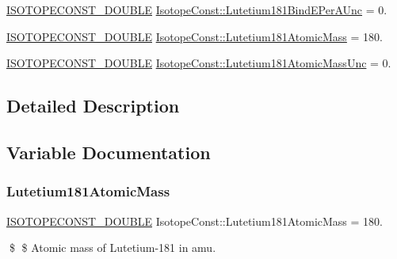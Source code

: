 \begin{DoxyCompactItemize}
\mbox{\hyperlink{group___isotope_const-_macros_ga8f45a7272ce02c0b4c65c44636ed719a}{I\+S\+O\+T\+O\+P\+E\+C\+O\+N\+S\+T\+\_\+\+D\+O\+U\+B\+LE}} \mbox{\hyperlink{group___isotope_const-_lutetium-_lu181_ga273de36f4896ca3aa2eb261a044ad5ef}{Isotope\+Const\+::\+Lutetium181\+Bind\+E\+Per\+A\+Unc}} = 0.
\item 
\mbox{\hyperlink{group___isotope_const-_macros_ga8f45a7272ce02c0b4c65c44636ed719a}{I\+S\+O\+T\+O\+P\+E\+C\+O\+N\+S\+T\+\_\+\+D\+O\+U\+B\+LE}} \mbox{\hyperlink{group___isotope_const-_lutetium-_lu181_ga4a160b5abe0c78e41e1a628c8f925eb1}{Isotope\+Const\+::\+Lutetium181\+Atomic\+Mass}} = 180.
\item 
\mbox{\hyperlink{group___isotope_const-_macros_ga8f45a7272ce02c0b4c65c44636ed719a}{I\+S\+O\+T\+O\+P\+E\+C\+O\+N\+S\+T\+\_\+\+D\+O\+U\+B\+LE}} \mbox{\hyperlink{group___isotope_const-_lutetium-_lu181_gaa7a58f877e75c5169ab76a0796108783}{Isotope\+Const\+::\+Lutetium181\+Atomic\+Mass\+Unc}} = 0.
\end{DoxyCompactItemize}


\subsection{Detailed Description}


\subsection{Variable Documentation}
\mbox{\label{group___isotope_const-_lutetium-_lu181_ga4a160b5abe0c78e41e1a628c8f925eb1}} 
\subsubsection{\texorpdfstring{Lutetium181\+Atomic\+Mass}{Lutetium181AtomicMass}}
{\footnotesize\ttfamily \mbox{\hyperlink{group___isotope_const-_macros_ga8f45a7272ce02c0b4c65c44636ed719a}{I\+S\+O\+T\+O\+P\+E\+C\+O\+N\+S\+T\+\_\+\+D\+O\+U\+B\+LE}} Isotope\+Const\+::\+Lutetium181\+Atomic\+Mass = 180.}

\$ \$ Atomic mass of Lutetium-\/181 in amu. \mbox{\label{group___isotope_const-_lutetium-_lu181_gaa7a58f877e75c5169ab76a0796108783}} 
